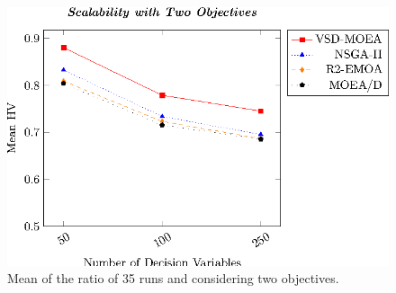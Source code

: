 %
%
%


\begin{figure}[t]
\centering
\includegraphics[]{Images/Graphic-Scalability-2obj_tikz-figure0.eps}
%
\caption{Mean of the ratio \HV{} of 35 runs and considering two objectives.}\label{fig:variable-decision-scalability-2obj}
\end{figure}

